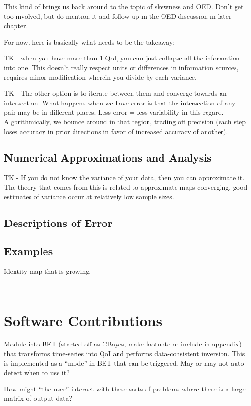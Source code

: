 This kind of brings us back around to the topic of skewness and OED. Don't get too involved, but do mention it and follow up in the OED discussion in later chapter.

For now, here is basically what needs to be the takeaway:

TK - when you have more than 1 QoI, you can just collapse all the information into one. This doesn't really respect units or differences in information sources, requires minor modification wherein you divide by each variance.

TK - The other option is to iterate between them and converge towards an intersection. What happens when we have error is that the intersection of any pair may be in different places. Less error = less variability in this regard.
Algorithmically, we bounce around in that region, trading off precision (each step loses accuracy in prior directions in favor of increased accuracy of another).


\subsection{Numerical Approximations and Analysis}


TK - If you do not know the variance of your data, then you can approximate it. The theory that comes from this is related to approximate maps converging. good estimates of variance occur at relatively low sample sizes.

\subsection{Descriptions of Error}

\subsection{Examples}

Identity map that is growing.

\
\section{Software Contributions}

Module into BET (started off as CBayes, make footnote or include in appendix) that transforms time-series into QoI and performs data-consistent inversion.
This is implemented as a ``mode'' in BET that can be triggered.
May or may not auto-detect when to use it?

How might ``the user'' interact with these sorts of problems where there is a large matrix of output data?


